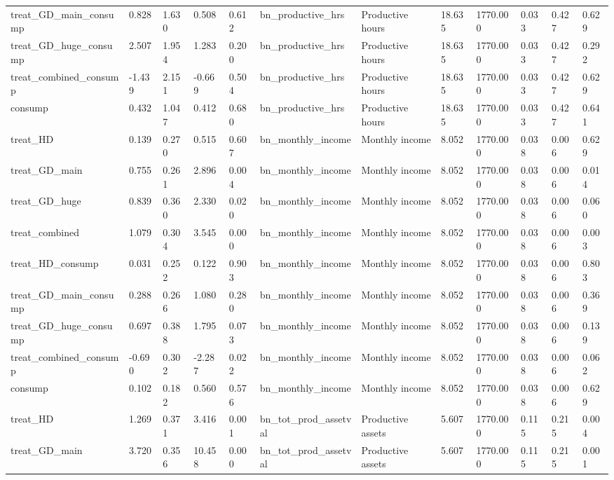 \begin{tabular}{llllllllllll}
treat\_GD\_main\_consump & 0.828 & 1.630 & 0.508 & 0.612 & bn\_productive\_hrs & Productive hours & 18.635 & 1770.000 & 0.033 & 0.427 & 0.629 \\
treat\_GD\_huge\_consump & 2.507 & 1.954 & 1.283 & 0.200 & bn\_productive\_hrs & Productive hours & 18.635 & 1770.000 & 0.033 & 0.427 & 0.292 \\
treat\_combined\_consump & -1.439 & 2.151 & -0.669 & 0.504 & bn\_productive\_hrs & Productive hours & 18.635 & 1770.000 & 0.033 & 0.427 & 0.629 \\
consump & 0.432 & 1.047 & 0.412 & 0.680 & bn\_productive\_hrs & Productive hours & 18.635 & 1770.000 & 0.033 & 0.427 & 0.641 \\
treat\_HD & 0.139 & 0.270 & 0.515 & 0.607 & bn\_monthly\_income & Monthly income & 8.052 & 1770.000 & 0.038 & 0.006 & 0.629 \\
treat\_GD\_main & 0.755 & 0.261 & 2.896 & 0.004 & bn\_monthly\_income & Monthly income & 8.052 & 1770.000 & 0.038 & 0.006 & 0.014 \\
treat\_GD\_huge & 0.839 & 0.360 & 2.330 & 0.020 & bn\_monthly\_income & Monthly income & 8.052 & 1770.000 & 0.038 & 0.006 & 0.060 \\
treat\_combined & 1.079 & 0.304 & 3.545 & 0.000 & bn\_monthly\_income & Monthly income & 8.052 & 1770.000 & 0.038 & 0.006 & 0.003 \\
treat\_HD\_consump & 0.031 & 0.252 & 0.122 & 0.903 & bn\_monthly\_income & Monthly income & 8.052 & 1770.000 & 0.038 & 0.006 & 0.803 \\
treat\_GD\_main\_consump & 0.288 & 0.266 & 1.080 & 0.280 & bn\_monthly\_income & Monthly income & 8.052 & 1770.000 & 0.038 & 0.006 & 0.369 \\
treat\_GD\_huge\_consump & 0.697 & 0.388 & 1.795 & 0.073 & bn\_monthly\_income & Monthly income & 8.052 & 1770.000 & 0.038 & 0.006 & 0.139 \\
treat\_combined\_consump & -0.690 & 0.302 & -2.287 & 0.022 & bn\_monthly\_income & Monthly income & 8.052 & 1770.000 & 0.038 & 0.006 & 0.062 \\
consump & 0.102 & 0.182 & 0.560 & 0.576 & bn\_monthly\_income & Monthly income & 8.052 & 1770.000 & 0.038 & 0.006 & 0.629 \\
treat\_HD & 1.269 & 0.371 & 3.416 & 0.001 & bn\_tot\_prod\_assetval & Productive assets & 5.607 & 1770.000 & 0.115 & 0.215 & 0.004 \\
treat\_GD\_main & 3.720 & 0.356 & 10.458 & 0.000 & bn\_tot\_prod\_assetval & Productive assets & 5.607 & 1770.000 & 0.115 & 0.215 & 0.001 \\

\end{tabular}
